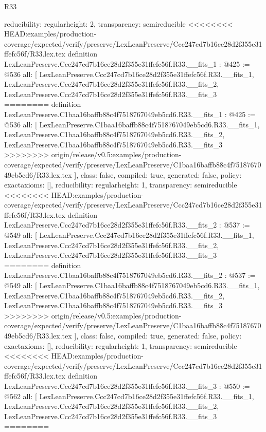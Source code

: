 \begin{lexlean}{R33}
\begin{coremodule}
{{{{{{{{{  reducibility: regular{height: 2},
  transparency: semireducible
}
<<<<<<<< HEAD:examples/production-coverage/expected/verify/preserve/LexLeanPreserve/Ccc247cd7b16ce28d2f355e31ffefc56f/R33.lex.tex
definition LexLeanPreserve.Ccc247cd7b16ce28d2f355e31ffefc56f.R33.__fits_1 : @425 := @536 {
  all: [
    LexLeanPreserve.Ccc247cd7b16ce28d2f355e31ffefc56f.R33.__fits_1,
    LexLeanPreserve.Ccc247cd7b16ce28d2f355e31ffefc56f.R33.__fits_2,
    LexLeanPreserve.Ccc247cd7b16ce28d2f355e31ffefc56f.R33.__fits_3
========
definition LexLeanPreserve.C1baa16baffb88c4f7518767049eb5cd6.R33.__fits_1 : @425 := @536 {
  all: [
    LexLeanPreserve.C1baa16baffb88c4f7518767049eb5cd6.R33.__fits_1,
    LexLeanPreserve.C1baa16baffb88c4f7518767049eb5cd6.R33.__fits_2,
    LexLeanPreserve.C1baa16baffb88c4f7518767049eb5cd6.R33.__fits_3
>>>>>>>> origin/release/v0.5:examples/production-coverage/expected/verify/preserve/LexLeanPreserve/C1baa16baffb88c4f7518767049eb5cd6/R33.lex.tex
  ],
  class: false,
  compiled: true,
  generated: false,
  policy: exact{axioms: []},
  reducibility: regular{height: 1},
  transparency: semireducible
}
<<<<<<<< HEAD:examples/production-coverage/expected/verify/preserve/LexLeanPreserve/Ccc247cd7b16ce28d2f355e31ffefc56f/R33.lex.tex
definition LexLeanPreserve.Ccc247cd7b16ce28d2f355e31ffefc56f.R33.__fits_2 : @537 := @549 {
  all: [
    LexLeanPreserve.Ccc247cd7b16ce28d2f355e31ffefc56f.R33.__fits_1,
    LexLeanPreserve.Ccc247cd7b16ce28d2f355e31ffefc56f.R33.__fits_2,
    LexLeanPreserve.Ccc247cd7b16ce28d2f355e31ffefc56f.R33.__fits_3
========
definition LexLeanPreserve.C1baa16baffb88c4f7518767049eb5cd6.R33.__fits_2 : @537 := @549 {
  all: [
    LexLeanPreserve.C1baa16baffb88c4f7518767049eb5cd6.R33.__fits_1,
    LexLeanPreserve.C1baa16baffb88c4f7518767049eb5cd6.R33.__fits_2,
    LexLeanPreserve.C1baa16baffb88c4f7518767049eb5cd6.R33.__fits_3
>>>>>>>> origin/release/v0.5:examples/production-coverage/expected/verify/preserve/LexLeanPreserve/C1baa16baffb88c4f7518767049eb5cd6/R33.lex.tex
  ],
  class: false,
  compiled: true,
  generated: false,
  policy: exact{axioms: []},
  reducibility: regular{height: 1},
  transparency: semireducible
}
<<<<<<<< HEAD:examples/production-coverage/expected/verify/preserve/LexLeanPreserve/Ccc247cd7b16ce28d2f355e31ffefc56f/R33.lex.tex
definition LexLeanPreserve.Ccc247cd7b16ce28d2f355e31ffefc56f.R33.__fits_3 : @550 := @562 {
  all: [
    LexLeanPreserve.Ccc247cd7b16ce28d2f355e31ffefc56f.R33.__fits_1,
    LexLeanPreserve.Ccc247cd7b16ce28d2f355e31ffefc56f.R33.__fits_2,
    LexLeanPreserve.Ccc247cd7b16ce28d2f355e31ffefc56f.R33.__fits_3
========
}}}}}}}}}}}
\end{coremodule}
\end{lexlean}
